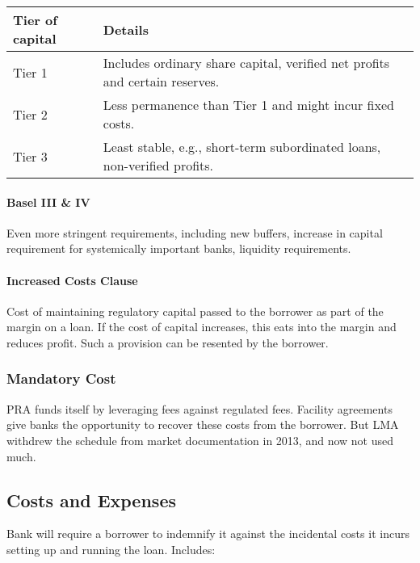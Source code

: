\documentclass[
]{article}
\begin{document}
\begin{longtable}[]{@{}ll@{}}
\toprule()
Tier of capital & Details \\
\midrule()
\endhead
Tier 1 & Includes ordinary share capital, verified net profits and
certain reserves. \\
Tier 2 & Less permanence than Tier 1 and might incur fixed costs. \\
Tier 3 & Least stable, e.g., short-term subordinated loans, non-verified
profits. \\
\bottomrule()
\end{longtable}

\hypertarget{basel-iii-iv}{%
\paragraph{Basel III \& IV}\label{basel-iii-iv}}

Even more stringent requirements, including new buffers, increase in
capital requirement for systemically important banks, liquidity
requirements.

\hypertarget{increased-costs-clause}{%
\paragraph{Increased Costs Clause}\label{increased-costs-clause}}

Cost of maintaining regulatory capital passed to the borrower as part of
the margin on a loan. If the cost of capital increases, this eats into
the margin and reduces profit. Such a provision can be resented by the
borrower.

\hypertarget{mandatory-cost}{%
\subsubsection{Mandatory Cost}\label{mandatory-cost}}

PRA funds itself by leveraging fees against regulated fees. Facility
agreements give banks the opportunity to recover these costs from the
borrower. But LMA withdrew the schedule from market documentation in
2013, and now not used much.

\hypertarget{costs-and-expenses}{%
\subsection{Costs and Expenses}\label{costs-and-expenses}}

Bank will require a borrower to indemnify it against the incidental
costs it incurs setting up and running the loan. Includes:
\end{document}
